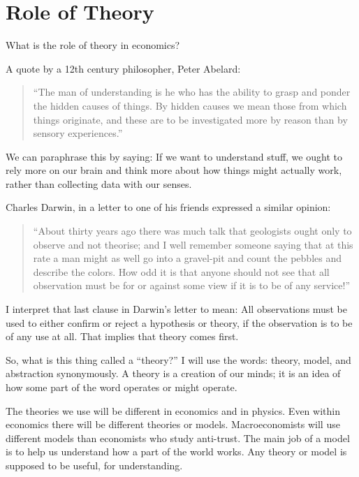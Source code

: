\documentclass[
]{book}
\begin{document}
\hypertarget{role-of-theory}{%
\section{Role of Theory}\label{role-of-theory}}

What is the role of theory in economics?

A quote by a 12th century philosopher, Peter Abelard:

\begin{quote}
``The man of understanding is he who has the ability to grasp and ponder the hidden causes of things. By hidden causes we mean those from which things originate, and these are to be investigated more by reason than by sensory experiences.''
\end{quote}

We can paraphrase this by saying: If we want to understand stuff, we ought to rely more on our brain and think more about how things might actually work, rather than collecting data with our senses.

Charles Darwin, in a letter to one of his friends expressed a similar opinion:

\begin{quote}
``About thirty years ago there was much talk that geologists ought only to observe and not theorise; and I well remember someone saying that at this rate a man might as well go into a gravel-pit and count the pebbles and describe the colors. How odd it is that anyone should not see that all observation must be for or against some view if it is to be of any service!''
\end{quote}

I interpret that last clause in Darwin's letter to mean: All observations must be used to either confirm or reject a hypothesis or theory, if the observation is to be of any use at all. That implies that theory comes first.

So, what is this thing called a ``theory?'' I will use the words: theory, model, and abstraction synonymously. A theory is a creation of our minds; it is an idea of how some part of the word operates or might operate.

The theories we use will be different in economics and in physics. Even within economics there will be different theories or models. Macroeconomists will use different models than economists who study anti-trust. The main job of a model is to help us understand how a part of the world works. Any theory or model is supposed to be useful, for understanding.
\end{document}
